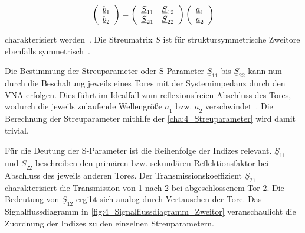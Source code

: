 \begin{equation}
\centering
    \left(\begin{array}{c}\underline{b}_1 \\ \underline{b}_2 \end{array}\right) = \left(\begin{array}{cc}\underline{S}_{11} & \underline{S}_{12} \\ \underline{S}_{21} & \underline{S}_{22} \end{array}\right) \left(\begin{array}{c}\underline{a}_{1} \\ \underline{a}_{2} \end{array}\right) \label{cha:4_Streuparameter}
\end{equation}

charakterisiert werden~\cite{Taschenbuch_HF-Technik}. Die Streumatrix $\underline{S}$ ist für struktursymmetrische Zweitore ebenfalls symmetrisch~\cite{Grundkurs_Hochfrequenztechnik}.  
\par
\vspace{\linespace}
Die Bestimmung der Streuparameter oder S-Parameter $\underline{S}_{11}$ bis $\underline{S}_{22}$ kann nun durch die Beschaltung jeweils eines Tores mit der Systemimpedanz durch den VNA erfolgen. Dies führt im Idealfall zum reflexionsfreien Abschluss des Tores, wodurch die jeweils zulaufende Wellengröße $\underline{a}_1$ bzw. $\underline{a}_2$ verschwindet~\cite{Grundkurs_Hochfrequenztechnik}. Die Berechnung der Streuparameter mithilfe der \Gleichung\eqref{cha:4_Streuparameter} wird damit trivial.
\par
\vspace{\linespace}
Für die Deutung der S-Parameter ist die Reihenfolge der Indizes relevant. $\underline{S}_{11}$ und $\underline{S}_{22}$ beschreiben den primären bzw. sekundären Reflektionsfaktor bei Abschluss des jeweils anderen Tores. Der Transmissionskoeffizient $\underline{S}_{21}$ charakterisiert die Transmission von 1 nach 2 bei abgeschlossenem Tor 2. Die Bedeutung von $\underline{S}_{12}$ ergibt sich analog durch Vertauschen der Tore. Das Signalflussdiagramm in \Abb\ref{fig:4_Signalflussdiagramm_Zweitor} veranschaulicht die Zuordnung der Indizes zu den einzelnen Streuparametern.
\par
\vspace{\linespace}

